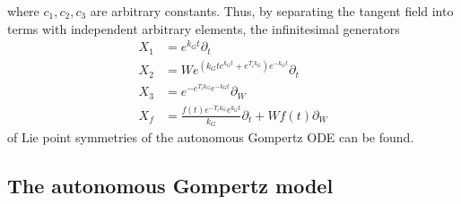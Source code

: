where \(c_1, c_2, c_3\) are arbitrary constants.
Thus, by separating the tangent field into terms with independent arbitrary elements, the infinitesimal generators
\begin{align}
  X_1 &= e^{k_{G} t} \partial_t \\
  X_2 &= W e^{\left(k_{G} t e^{k_{G} t} + e^{T_{i} k_{G}}\right) e^{- k_{G} t}} \partial_t \\
  X_3 &= e^{- e^{T_{i} k_{G}} e^{- k_{G} t}} \partial_W \\
  X_f &= \frac{f{\left(t \right)} e^{- T_{i} k_{G}} e^{k_{G} t}}{k_{G}} \partial_t + W f{\left(t \right)} \partial_W
\end{align}
of Lie point symmetries of the autonomous Gompertz ODE  can be found.

\subsection{The autonomous Gompertz model}

